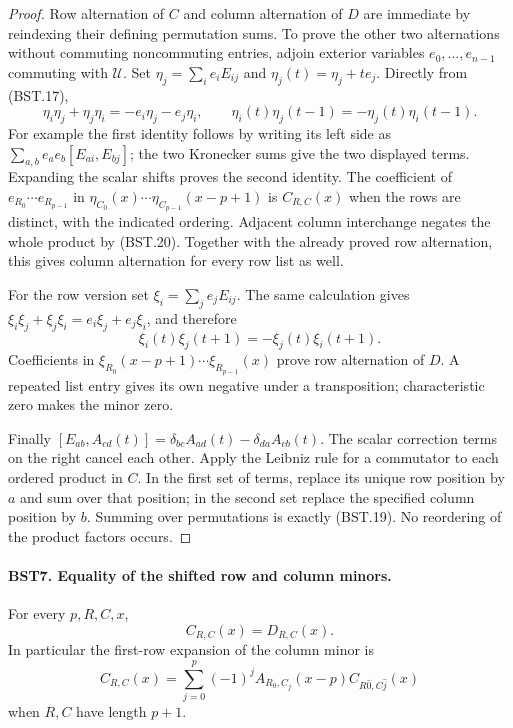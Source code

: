 \begin{proof}
Row alternation of $C$ and column alternation of $D$ are immediate
by reindexing their defining permutation sums.  To prove the other
two alternations without commuting noncommuting entries, adjoin
exterior variables $e_0,\ldots,e_{n-1}$ commuting with $\mathcal U$.
Set
$\eta_j=\sum_i e_iE_{ij}$ and $\eta_j(t)=\eta_j+te_j$.
Directly from (BST.17),
\[
 \eta_i\eta_j+\eta_j\eta_i=-e_i\eta_j-e_j\eta_i,
 \qquad
 \eta_i(t)\eta_j(t-1)=-\eta_j(t)\eta_i(t-1).
 \tag{BST.20}
\]
For example the first identity follows by writing its left side as
$\sum_{a,b}e_ae_b[E_{ai},E_{bj}]$; the two Kronecker sums give
the two displayed terms.  Expanding the scalar shifts proves the
second identity.  The coefficient of
$e_{R_0}\cdots e_{R_{p-1}}$ in
$\eta_{C_0}(x)\cdots\eta_{C_{p-1}}(x-p+1)$ is
$C_{R,C}(x)$ when the rows are distinct, with the indicated ordering.
Adjacent column interchange negates the whole product by (BST.20).
Together with the already proved row alternation, this gives column
alternation for every row list as well.

For the row version set $\xi_i=\sum_j e_jE_{ij}$.
The same calculation gives
$\xi_i\xi_j+\xi_j\xi_i=e_i\xi_j+e_j\xi_i$, and therefore
\[
       \xi_i(t)\xi_j(t+1)=-\xi_j(t)\xi_i(t+1).
 \tag{BST.21}
\]
Coefficients in
$\xi_{R_0}(x-p+1)\cdots\xi_{R_{p-1}}(x)$ prove row alternation of
$D$.  A repeated list entry gives its own negative under a
transposition; characteristic zero makes the minor zero.

Finally
$[E_{ab},A_{cd}(t)]=
\delta_{bc}A_{ad}(t)-\delta_{da}A_{cb}(t)$.
The scalar correction terms on the right cancel each other.
Apply the Leibniz rule for a commutator to each ordered product
in $C$.  In the first set of terms, replace its unique row position
by $a$ and sum over that position; in the second set replace the
specified column position by $b$.  Summing over permutations is
exactly (BST.19).  No reordering of the product factors occurs.
\end{proof}

\paragraph{BST7. Equality of the shifted row and column minors.}
\label{claim:BST7}
For every $p,R,C,x$,
\[
                         C_{R,C}(x)=D_{R,C}(x).
 \tag{BST.22}
\]
In particular the first-row expansion of the column minor is
\[
 C_{R,C}(x)=
 \sum_{j=0}^{p}(-1)^j A_{R_0,C_j}(x-p)
           C_{R\widehat{0},C\widehat{j}}(x)
 \tag{BST.23}
\]
when $R,C$ have length $p+1$.

